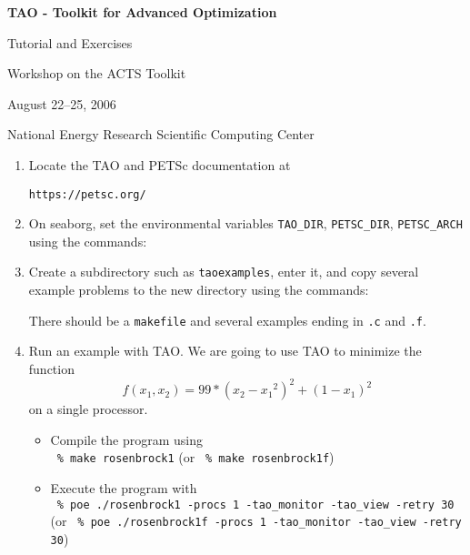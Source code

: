 \documentclass[11pt]{article}
\begin{document}
\begin{center}
{\bf
TAO - Toolkit for Advanced Optimization

Tutorial and Exercises

\vspace{0.25in}

Workshop on the ACTS Toolkit

August 22--25, 2006

National Energy Research Scientific Computing Center
}
\end{center}
\vspace{0.25in}

\begin{enumerate}

\item Locate the TAO and PETSc documentation at
\begin{alltt}
https://petsc.org/
\end{alltt}

\item On seaborg, set the environmental variables
\texttt{TAO\_DIR}, \texttt{PETSC\_DIR}, \texttt{PETSC\_ARCH}
using the commands:
\begin{alltt}
% module load tao/1.8.1
% export PETSC_ARCH=rs6000_sp_g_c++
\end{alltt}

\item Create a subdirectory such as \texttt{taoexamples}, enter it, and copy several example problems to the new directory using the commands:
\begin{alltt}
% mkdir taoexamples
% cd taoexamples
% cp -R \$TAO_DIR/src/unconstrained/tutorials/* .
% ls
\end{alltt}
There should be a \texttt{makefile} and several examples ending in \texttt{.c} and \texttt{.f}.

\item Run an example with TAO.
We are going to use TAO to minimize the function
\[
    f(x_1,x_2) = 99*(x_2-{x_1}^2)^2 + (1-x_1)^2
\]
on a single processor.
\begin{itemize}

 \item Compile the program using \\
  \quad \texttt{ \% make rosenbrock1}
  (or \texttt{ \% make rosenbrock1f})

 \item Execute the program with \\
  \quad \texttt{ \% poe ./rosenbrock1 -procs 1 -tao\_monitor -tao\_view -retry 30} (or
  \texttt{ \% poe ./rosenbrock1f -procs 1 -tao\_monitor -tao\_view -retry 30})


\end{itemize}
\end{enumerate}
\end{document}
